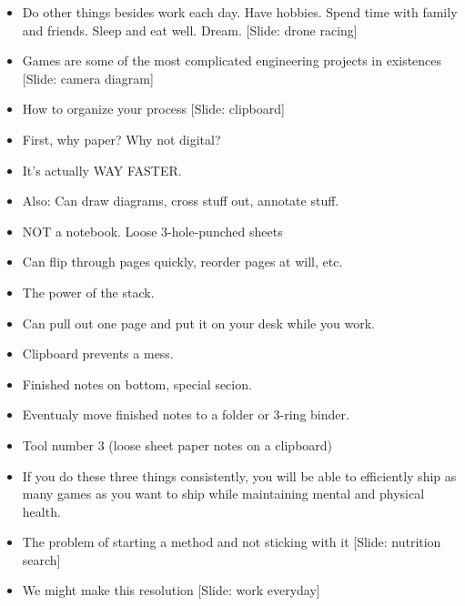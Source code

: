 \documentclass[12pt]{article}
\begin{document}
{\begin{itemize}
\item Do other things besides work each day.  Have hobbies.  Spend time with family and friends.  Sleep and eat well.  Dream. [Slide:  drone racing]


\item Games are some of the most complicated engineering projects in existences [Slide: camera diagram]

\item How to organize your process [Slide: clipboard]

\item First, why paper?  Why not digital?

\item It's actually WAY FASTER.

\item Also:  Can draw diagrams, cross stuff out, annotate stuff.

\item NOT a notebook.  Loose 3-hole-punched sheets

\item Can flip through pages quickly, reorder pages at will, etc.

\item The power of the stack.

\item Can pull out one page and put it on your desk while you work.

\item Clipboard prevents a mess.

\item Finished notes on bottom, special secion.

\item Eventualy move finished notes to a folder or 3-ring binder.

\item Tool number 3 (loose sheet paper notes on a clipboard)





\item If you do these three things consistently, you will be able to efficiently ship as many games as you want to ship while maintaining mental and physical health.

\item The problem of starting a method and not sticking with it [Slide: nutrition search]

\item We might make this resolution [Slide: work everyday]


\end{itemize}}
\end{document}
